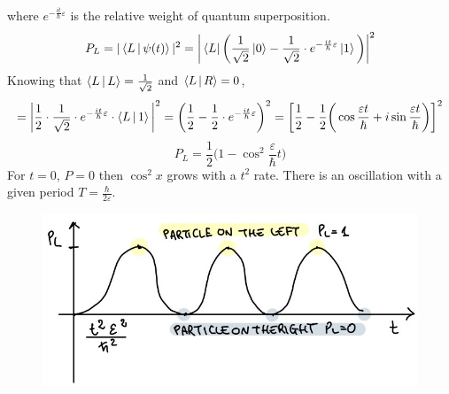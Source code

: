where $e^{-\frac{it}{\hbar}\varepsilon}$ is the relative weight of quantum superposition.\\
\newline
\[
P_L=|\braket{L\,|\,\psi(t)}|^2=\bigg|\bra {L}\bigg(\frac{1}{\sqrt{2}}\ket{0}-\frac{1}{\sqrt{2}}\cdot e^{-\frac{it}{\hbar}\varepsilon} \ket{1} \bigg)\bigg|^2
\]
Knowing that $\braket{L\,|\,L}=\frac{1}{\sqrt{2}}$ and $\braket{L\,|\,R}=0$,
\[
= \bigg|\frac{1}{2}\cdot \frac{1}{\sqrt{2}}\cdot e^{-\frac{it}{\hbar}\varepsilon} \cdot \braket{L\,|\,1}\bigg|^2=\bigg(\frac{1}{2}-\frac{1}{2}\cdot e^{-\frac{it}{\hbar}\varepsilon}\bigg)^2=\bigg[\frac{1}{2}-\frac{1}{2}\bigg(\cos\frac{\varepsilon t}{\hbar}+i\sin\frac{\varepsilon t}{\hbar}\bigg)\bigg]^2
\]
\[
P_L=\frac{1}{2}\bigg(1-\cos^2\frac{\varepsilon}{\hbar}t\bigg)
\]
For $t=0$, $P=0$ then $\cos^2x$ grows with a $t^2$ rate. There is an oscillation with a given period $T=\frac{\hbar}{2\varepsilon}$.\\
\begin{figure}[htbp!]
	\centering
	\includegraphics[scale=0.30]{img_3.jpg}
\end{figure}
\newline
